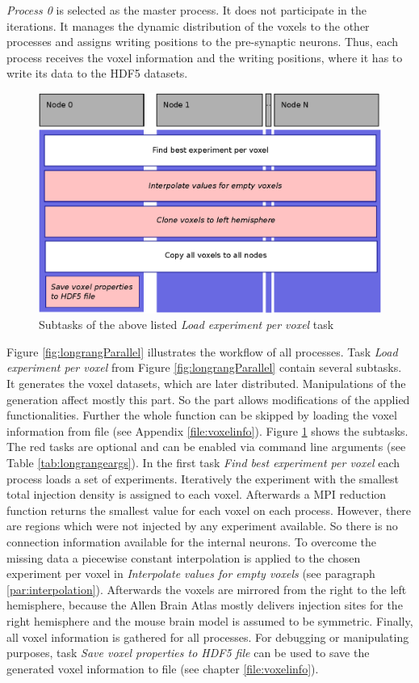 \emph{Process 0} is selected as the master process. It does not participate in the iterations.
It manages the dynamic distribution of the voxels to the other processes and 
assigns writing positions to the pre-synaptic neurons. Thus, each process receives the 
voxel information and the writing positions,
where it has to write its data to the HDF5 datasets.
\begin{figure}[ht!]
\centering
\includegraphics[scale=0.5]{pictures/longRange_BestExp_parallelAlg.eps}
\caption{Subtasks of the above listed \emph{Load experiment per voxel} task}
\label{fig:longrangeLEPV}
\end{figure}

Figure \ref{fig:longrangParallel} illustrates the workflow of all processes.
Task \emph{Load experiment per voxel} from Figure \ref{fig:longrangParallel} contain several subtasks.
It generates the voxel datasets, which are later distributed.
Manipulations of the generation affect mostly this part.
So the part allows modifications of the applied functionalities. 
Further the whole function can be skipped by loading the voxel information from file (see Appendix \ref{file:voxelinfo}).
Figure \ref{fig:longrangeLEPV} shows the subtasks.
The red tasks are optional and can be enabled via command line arguments (see Table \ref{tab:longrangeargs}).
In the first task \emph{Find best experiment per voxel} each process loads a set of experiments.
Iteratively the experiment with the smallest total injection density is assigned to each voxel.
Afterwards a MPI reduction function returns the smallest value for each voxel on
each process.
However, there are regions which were not injected by any experiment available.
So there is no connection information available for the internal neurons.
To overcome the missing data a piecewise constant interpolation is applied to the chosen experiment per voxel
in \emph{Interpolate values for empty voxels} (see paragraph \ref{par:interpolation}).
Afterwards the voxels are mirrored from the right to the left hemisphere, because the
Allen Brain Atlas mostly delivers injection sites for the right hemisphere and
the mouse brain model is assumed to be symmetric.
Finally, all voxel information is gathered for all processes.
For debugging or manipulating purposes, task \emph{Save voxel properties to HDF5 file} can be used
to save the generated voxel information to file (see chapter \ref{file:voxelinfo}).

